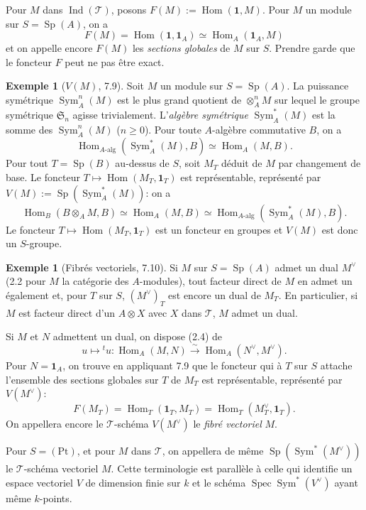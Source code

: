 \documentclass[12pt,a4paper]{article}
\theoremstyle{plain}
\theoremstyle{definition}
\newtheorem{example}[theorem]{Exemple}
\DeclareMathOperator{\Spec}{Spec}
\DeclareMathOperator{\Sp}{Sp}
\DeclareMathOperator{\Hom}{Hom}
\DeclareMathOperator{\Sym}{Sym}
\DeclareMathOperator{\Ind}{Ind}
\begin{document}
Pour $M$ dans $\Ind(\mathcal{T})$, posons $F(M) := \Hom(\mathbf{1}, M)$. Pour $M$ un module sur $S = \Sp(A)$, on a
\[
F(M) = \Hom(\mathbf{1}, \mathbf{1}_A) \simeq \Hom_A(\mathbf{1}_A, M)
\]
et on appelle encore $F(M)$ les \emph{sections globales} de $M$ sur $S$. Prendre garde que le foncteur $F$ peut ne pas être exact.

\begin{example}[$V(M)$, 7.9]
Soit $M$ un module sur $S = \Sp(A)$. La puissance symétrique $\Sym^n_A(M)$ est le plus grand quotient de $\otimes^n_A M$ sur lequel le groupe symétrique $\mathfrak{S}_n$ agisse trivialement. L'\emph{algèbre symétrique} $\Sym^*_A(M)$ est la somme des $\Sym^n_A(M)$ ($n \geq 0$). Pour toute $A$-algèbre commutative $B$, on a
\[
\Hom_{A\text{-alg}}(\Sym^*_A(M), B) \simeq \Hom_A(M, B).
\]
Pour tout $T = \Sp(B)$ au-dessus de $S$, soit $M_T$ déduit de $M$ par changement de base. Le foncteur $T \mapsto \Hom(M_T, \mathbf{1}_T)$ est représentable, représenté par $V(M) := \Sp(\Sym^*_A(M))$: on a
\[
\Hom_B(B \otimes_A M, B) \simeq \Hom_A(M, B) \simeq \Hom_{A\text{-alg}}(\Sym^*_A(M), B).
\]
Le foncteur $T \mapsto \Hom(M_T, \mathbf{1}_T)$ est un foncteur en groupes et $V(M)$ est donc un $S$-groupe.
\end{example}

\begin{example}[Fibrés vectoriels, 7.10]
Si $M$ sur $S = \Sp(A)$ admet un dual $M^\vee$ (2.2 pour $M$ la catégorie des $A$-modules), tout facteur direct de $M$ en admet un également et, pour $T$ sur $S$, $(M^\vee)_T$ est encore un dual de $M_T$. En particulier, si $M$ est facteur direct d'un $A \otimes X$ avec $X$ dans $\mathcal{T}$, $M$ admet un dual.

Si $M$ et $N$ admettent un dual, on dispose (2.4) de
\[
u \mapsto {}^t u : \Hom_A(M, N) \xrightarrow{\sim} \Hom_A(N^\vee, M^\vee).
\]
Pour $N = \mathbf{1}_A$, on trouve en appliquant 7.9 que le foncteur qui à $T$ sur $S$ attache l'ensemble des sections globales sur $T$ de $M_T$ est représentable, représenté par $V(M^\vee)$:
\[
F(M_T) = \Hom_T(\mathbf{1}_T, M_T) = \Hom_T(M_T^\vee, \mathbf{1}_T).
\]
On appellera encore le $\mathcal{T}$-schéma $V(M^\vee)$ le \emph{fibré vectoriel} $M$.

Pour $S = (\mathrm{Pt})$, et pour $M$ dans $\mathcal{T}$, on appellera de même $\Sp(\Sym^*(M^\vee))$ le $\mathcal{T}$-schéma vectoriel $M$. Cette terminologie est parallèle à celle qui identifie un espace vectoriel $V$ de dimension finie sur $k$ et le schéma $\Spec \Sym^*(V^\vee)$ ayant même $k$-points.
\end{example}
\end{document}

